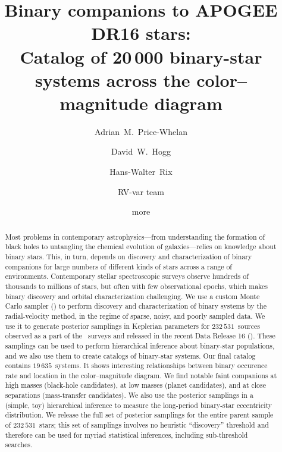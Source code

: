 \documentclass[modern]{aastex63}
\newcommand{\nsources}{\ensuremath{232\,531}}
\newcommand{\nbinary}{\ensuremath{19\,635}}
\begin{document}
\title{Binary companions to APOGEE DR16 stars: \\
       Catalog of 20\,000 binary-star systems
       across the color--magnitude diagram}

\author[0000-0003-0872-7098]{Adrian~M.~Price-Whelan}

\author[0000-0003-2866-9403]{David~W.~Hogg}

\author[0000-0003-4996-9069]{Hans-Walter~Rix}

\author{RV-var team}

\author{more}

\begin{abstract}\noindent
Most problems in contemporary astrophysics---from understanding the formation
of black holes to untangling the chemical
evolution of galaxies---relies on knowledge about binary stars.
This, in turn, depends on discovery and characterization of binary companions for
large numbers of different kinds of stars across a range of environments.
Contemporary stellar spectroscopic surveys observe hundreds of thousands
to millions of stars, but
often with few observational epochs, which makes binary discovery
and orbital characterization challenging.
We use a custom Monte Carlo sampler (\thejoker) to perform discovery and characterization
of binary systems by the radial-velocity method, in the regime of
sparse, noisy, and poorly sampled data.
We use it to generate posterior samplings in Keplerian parameters for
\nsources\ sources observed as a part of the \apogee\ surveys and released in
the recent Data Release 16 ().
These samplings can be used to perform hierarchical inference about binary-star
populations, and we also use them to create catalogs of binary-star systems.
Our final catalog contains \nbinary\ systems.
It shows interesting relationships between
binary occurence rate and location in the color--magnitude diagram.
We find notable
faint companions at high masses (black-hole candidates), at low masses (planet candidates),
and at close separations (mass-transfer candidates).
We also use the posterior  samplings in a (simple, toy) hierarchical inference to
measure the long-period binary-star eccentricity distribution.
We release the full set of posterior samplings for the entire parent
sample of \nsources\ stars; this set of samplings involves no heuristic ``discovery''
threshold and therefore can be used for myriad statistical inferences, including sub-threshold
searches.
\end{abstract}
\end{document}
